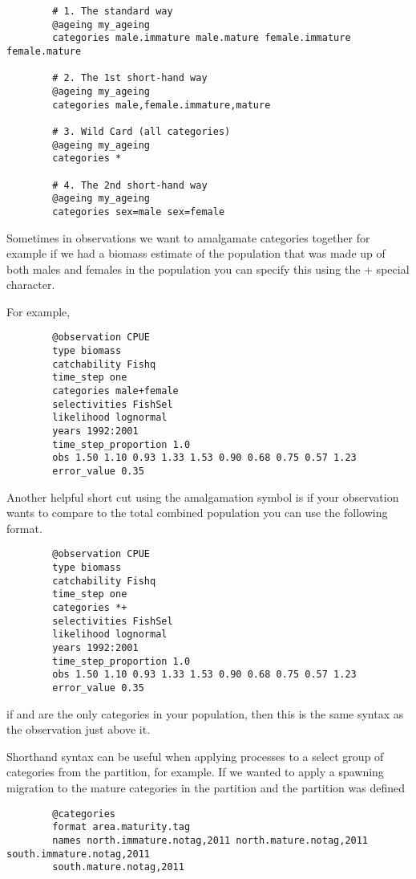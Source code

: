 {\small{\begin{verbatim}
		# 1. The standard way
		@ageing my_ageing
		categories male.immature male.mature female.immature female.mature

		# 2. The 1st short-hand way
		@ageing my_ageing
		categories male,female.immature,mature

		# 3. Wild Card (all categories)
		@ageing my_ageing
		categories *

		# 4. The 2nd short-hand way
		@ageing my_ageing
		categories sex=male sex=female
		\end{verbatim}}}

Sometimes in observations we want to amalgamate categories together for example if we had a biomass estimate of the population that was made up of both males and females in the population you can specify this using the + special character.

For example,

{\small{\begin{verbatim}
		@observation CPUE
		type biomass
		catchability Fishq
		time_step one
		categories male+female
		selectivities FishSel
		likelihood lognormal
		years 1992:2001
		time_step_proportion 1.0
		obs 1.50 1.10 0.93 1.33 1.53 0.90 0.68 0.75 0.57 1.23
		error_value 0.35
		\end{verbatim}}}

Another helpful short cut using the amalgamation symbol \subcommand{+} is if your observation wants to compare to the total combined population you can use the following format.

{\small{\begin{verbatim}
		@observation CPUE
		type biomass
		catchability Fishq
		time_step one
		categories *+
		selectivities FishSel
		likelihood lognormal
		years 1992:2001
		time_step_proportion 1.0
		obs 1.50 1.10 0.93 1.33 1.53 0.90 0.68 0.75 0.57 1.23
		error_value 0.35
		\end{verbatim}}}

if  and  are the only categories in your population, then this is the same syntax as the observation just above it.

Shorthand syntax can be useful when applying processes to a select group of categories from the partition, for example. If we wanted to apply a spawning migration to the mature categories in the partition and the partition was defined

{\small{\begin{verbatim}
		@categories
		format area.maturity.tag
		names north.immature.notag,2011 north.mature.notag,2011 south.immature.notag,2011
		south.mature.notag,2011
		\end{verbatim}}}

